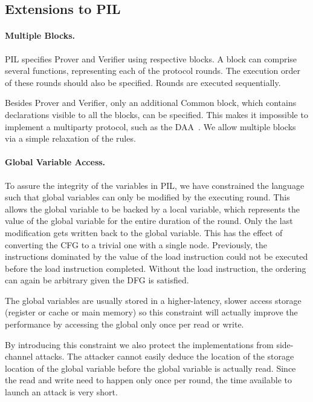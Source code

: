 
\subsection{Extensions to PIL}
\label{extensionsPIL}

\paragraph{Multiple Blocks.}
PIL specifies Prover and Verifier using respective blocks. A block can
comprise several functions, representing each of the protocol
rounds. The execution order of these rounds should also be
specified. Rounds are executed sequentially.

Besides Prover and Verifier, only an additional Common block, which
contains declarations visible to all the blocks, can be
specified. This makes it impossible to implement a multiparty
protocol, such as the DAA~\cite{DBLP:conf/ccs/BrickellCC04}. We allow
multiple blocks via a simple relaxation of the rules.

\paragraph{Global Variable Access.}
To assure the integrity of the variables in PIL, we have constrained
the language such that global variables can only be modified by the
executing round. This allows the global variable to be backed by a
local variable, which represents the value of the global variable for
the entire duration of the round. Only the last modification gets
written back to the global variable. This has the effect of converting
the CFG to a trivial one with a single node. Previously, the
instructions dominated by the value of the load instruction could not
be executed before the load instruction completed. Without the load
instruction, the ordering can again be arbitrary given the DFG is
satisfied.

The global variables are usually stored in a higher-latency, slower
access storage (register or cache or main memory) so this constraint
will actually improve the performance by accessing the global only
once per read or write.

By introducing this constraint we also protect the implementations
from side-channel attacks. The attacker cannot easily deduce the
location of the storage location of the global variable before the
global variable is actually read. Since the read and write need to
happen only once per round, the time available to launch an attack is
very short.


